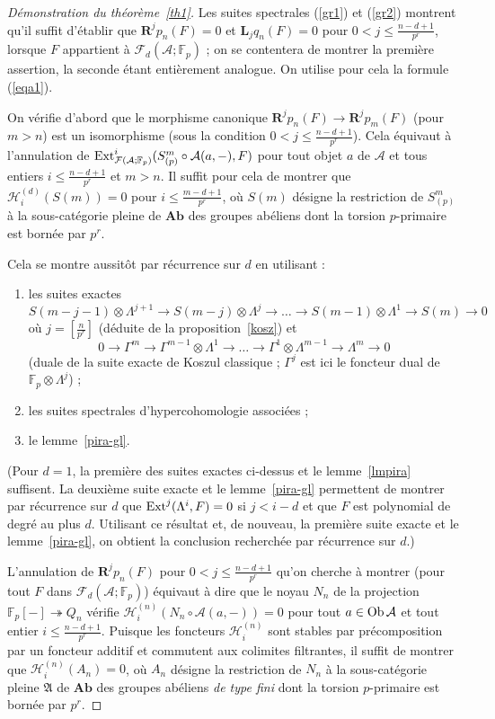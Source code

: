 \documentclass[a4paper,10pt]{article}
\newcommand{\A}{{\mathcal{A}}}
\newcommand{\F}{{\mathcal{F}}}
\newcommand{\Hh}{{\mathcal{H}}}
\theoremstyle{definition}
\theoremstyle{remark}
\begin{document}
\begin{proof}[Démonstration du théorème~\ref{th1}]
 Les suites spectrales (\ref{gr1}) et (\ref{gr2}) montrent qu'il suffit d'établir que $\mathbf{R}^j p_n(F)=0$ et $\mathbf{L}_j q_n(F)=0$ pour $0<j\leq\frac{n-d+1}{p^r}$, lorsque $F$ appartient à $\F_d(\A;\mathbb{F}_p)$ ; on se contentera de montrer la première assertion, la seconde étant entièrement analogue. On utilise pour cela la formule (\ref{eqa1}).

On vérifie d'abord que le morphisme canonique $\mathbf{R}^j p_n(F)\to\mathbf{R}^j p_m(F)$ (pour $m>n$) est un isomorphisme (sous la condition $0<j\leq\frac{n-d+1}{p^r}$). Cela équivaut à l'annulation de ${\rm Ext}^i_{\F(\A;\mathbb{F}_p)}(S^m_{(p)}\circ\A(a,-),F)$ pour tout objet $a$ de $\A$ et tous entiers $i\leq\frac{n-d+1}{p^r}$ et $m>n$. Il suffit pour cela de montrer que $\Hh^{(d)}_i(S(m))=0$ pour $i\leq\frac{m-d+1}{p^r}$, où $S(m)$ désigne la restriction de $S^m_{(p)}$ à la sous-catégorie pleine de $\mathbf{Ab}$ des groupes abéliens dont la torsion $p$-primaire est bornée par $p^r$.

Cela se montre aussitôt par récurrence sur $d$ en utilisant :
\begin{enumerate}
 \item les suites exactes
$$S(m-j-1)\otimes\Lambda^{j+1}\to S(m-j)\otimes\Lambda^j\to\dots\to S(m-1)\otimes\Lambda^1\to S(m)\to 0$$
où $j=[\frac{n}{p^r}]$ (déduite de la proposition~\ref{kosz})
et
$$0\to\Gamma^m\to\Gamma^{m-1}\otimes\Lambda^1\to\dots\to\Gamma^1\otimes\Lambda^{m-1}\to\Lambda^m\to 0$$
(duale de la suite exacte de Koszul classique ; $\Gamma^j$ est ici le foncteur dual de $\mathbb{F}_p\otimes\Lambda^j$) ;
\item les suites spectrales d'hypercohomologie associées ;
\item le lemme~\ref{pira-gl}.
\end{enumerate}
(Pour $d=1$, la première des suites exactes ci-dessus et le lemme~\ref{lmpira} suffisent. La deuxième suite exacte et le lemme~\ref{pira-gl} permettent de montrer par récurrence sur $d$ que ${\rm Ext}^j(\Lambda^i,F)=0$ si $j<i-d$ et que $F$ est polynomial de degré au plus $d$. Utilisant ce résultat et, de nouveau, la première suite exacte et le lemme~\ref{pira-gl}, on obtient la conclusion recherchée par récurrence sur $d$.)

L'annulation de $\mathbf{R}^j p_n(F)$ pour  $0<j\leq\frac{n-d+1}{p^r}$ qu'on cherche à montrer (pour tout $F$ dans $\F_d(\A;\mathbb{F}_p)$) équivaut à dire que le noyau $N_n$ de la projection $\mathbb{F}_p[-]\twoheadrightarrow Q_n$ vérifie $\Hh_i^{(n)}(N_n\circ\A(a,-))=0$ pour tout $a\in {\rm Ob}\,\A$ et tout entier $i\leq\frac{n-d+1}{p^r}$. Puisque les foncteurs $\Hh_i^{(n)}$ sont stables par précomposition par un foncteur additif et commutent aux colimites filtrantes, il suffit de montrer que $\Hh_i^{(n)}(A_n)=0$, où $A_n$ désigne la restriction de $N_n$ à la sous-catégorie pleine $\mathfrak{A}$ de $\mathbf{Ab}$ des groupes abéliens {\em de type fini} dont la torsion $p$-primaire est bornée par $p^r$.


\end{proof}
\end{document}
